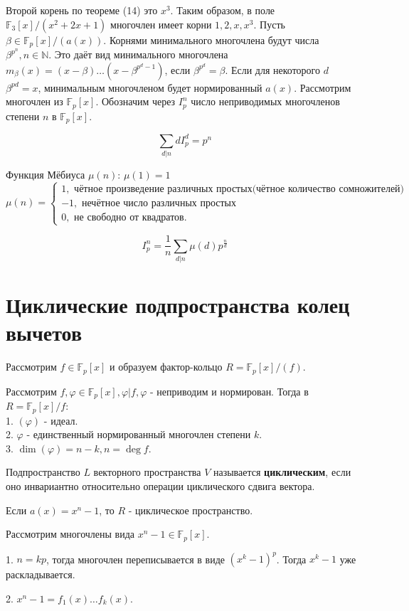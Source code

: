 \documentclass[11pt]{article}
\newcounter{th}\setcounter{th}{0}
\def\th{\par\smallskip\refstepcounter{th}\textbf{\arabic{th}}}
\newtheorem*{Theorem}{Теорема \th}
\begin{document}
Второй корень по теореме (14) это $x^3$. Таким образом, в поле $\mathbb{F}_3[x] / (x^2 + 2x + 1)$ многочлен имеет корни
$1, 2, x, x^3$.
Пусть $\beta \in \mathbb{F}_p[x] / (a(x))$. Корнями минимального многочлена будут числа $\beta^{p^n}, n \in \mathbb{N}$.
Это даёт вид минимального многочлена $m_{\beta}(x) = (x - \beta)\ldots(x - \beta^{p^d - 1})$, если
$\beta^{p^d} = \beta$. Если для некоторого $d$ $\beta^{pd} = x$, минимальным многочленом будет
нормированный $a(x)$.
Рассмотрим многочлен из $\mathbb{F}_p[x]$. Обозначим через $I^n_p$ число неприводимых многочленов
степени $n$ в $\mathbb{F}_p[x]$.
\begin{Theorem}
\begin{equation}
\sum_{d|n}dI_p^d = p^n
\end{equation}
\end{Theorem}
Функция Мёбиуса $\mu(n)$: $\mu(1) = 1$
\begin{equation}
\mu(n) = \begin{cases}1, \text{ чётное произведение различных простых(чётное количество сомножителей)} \\
-1, \text{ нечётное число различных простых}\\
0, \text{ не свободно от квадратов}.
\end{cases}
\end{equation}
\begin{Theorem}
\begin{equation}
I_p^n = \frac1n\sum_{d|n}\mu(d)p^{\frac{n}d}
\end{equation}
\end{Theorem}
\section{Циклические подпространства колец вычетов}
\label{sec:orgd10a250}
Рассмотрим $f \in \mathbb{F}_p[x]$ и образуем фактор-кольцо $R = \mathbb{F}_p[x]/(f)$.
\begin{Theorem}
Рассмотрим $f, \varphi \in \mathbb{F}_p[x], \varphi | f, \varphi$ - неприводим и нормирован.
Тогда в $R = \mathbb{F}_p[x] / f$:\\
1. $(\varphi)$ - идеал.\\
2. $\varphi$ - единственный нормированный многочлен степени $k$.\\
3. $\operatorname{dim}(\varphi) = n - k, n = \operatorname{deg} f$.\\
\end{Theorem}
Подпространство $L$ векторного пространства $V$ называется \textbf{циклическим}, если оно
инвариантно относительно операции циклического сдвига вектора.
\begin{Theorem}
Если $a(x) = x^n - 1$, то $R$ - циклическое пространство.
\end{Theorem}

Рассмотрим многочлены вида $x^n - 1 \in \mathbb{F}_p[x]$.

1. $n = kp$, тогда многочлен переписывается в виде $(x^k - 1)^p$. Тогда $x^k - 1$ уже
раскладывается.

2. $x^n - 1 = f_1(x)\ldots f_k(x)$.
\end{document}
